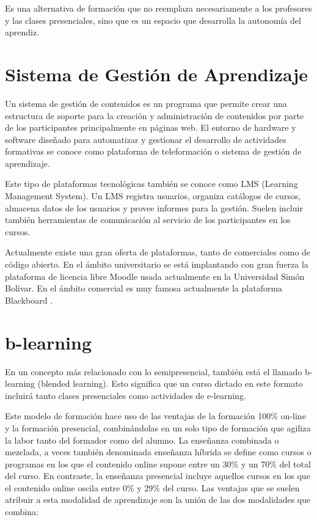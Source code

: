 Es una alternativa de formación que no reemplaza necesariamente a los profesores y las clases presenciales, sino que es un espacio que desarrolla la autonomía del aprendiz.

\section{Sistema de Gestión de Aprendizaje}

Un sistema de gestión de contenidos es un programa que permite crear una estructura de soporte para la creación y administración de contenidos por parte de los participantes principalmente en páginas web. El entorno de hardware y software diseñado para automatizar y gestionar el desarrollo de actividades formativas se conoce como plataforma de teleformación o sistema de gestión de aprendizaje.

Este tipo de plataformas tecnológicas también se conoce como LMS (Learning Management System). Un LMS registra usuarios, organiza catálogos de cursos, almacena datos de los usuarios y provee informes para la gestión. Suelen incluir también herramientas de comunicación al servicio de los participantes en los cursos. 

Actualmente existe una gran oferta de plataformas, tanto de comerciales como de código abierto. En el ámbito universitario se está implantando con gran fuerza la plataforma de licencia libre Moodle usada actualmente en la Universidad Simón Bolívar. En el ámbito comercial es muy famosa actualmente la plataforma Blackboard .

\section{b-learning}

En un concepto más relacionado con lo semipresencial, también está el llamado b-learning (blended learning). Esto significa que un curso dictado en este formato incluirá tanto clases presenciales como actividades de e-learning.

Este modelo de formación hace uso de las ventajas de la formación 100\% on-line y la formación presencial, combinándolas en un solo tipo de formación que agiliza la labor tanto del formador como del alumno. La enseñanza combinada o mezclada, a veces también denominada enseñanza híbrida se define como cursos o programas en los que el contenido online supone entre un 30\% y un 70\% del total del curso. En contraste, la enseñanza presencial incluye aquellos cursos en los que el contenido online oscila entre 0\% y 29\% del curso. Las ventajas que se suelen atribuir a esta modalidad de aprendizaje son la unión de las dos modalidades que combina:

